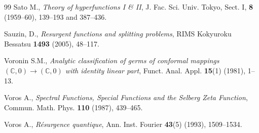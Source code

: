 \documentclass[a4paper,11pt]{amsart}
\numberwithin{equation}{section}
\newcommand{\C}{{\mathbb C}}
\theoremstyle{definition}
\begin{document}
\begin{thebibliography}{99}
	 Sato M., \emph{Theory of hyperfunctions I \& II}, J. Fac. Sci. Univ. Tokyo, Sect. I, \textbf{8} (1959–60), 139–193 and 387–436.
	
	 Sauzin, D., \emph{Resurgent functions and splitting problems}, RIMS Kokyuroku Bessatsu \textbf{1493} (2005), 48--117.
	
	 Voronin S.M., \emph{Analytic classification of germs of conformal mappings $(\C,0)\to(\C,0)$ with identity linear part}, Funct. Anal. Appl. \textbf{15}(1) (1981), 1--13.
	
	 Voros A., \emph{Spectral Functions, Special Functions and the Selberg Zeta Function}, Commun. Math. Phys. \textbf{110} (1987), 439--465.

	 Voros A., \emph{R\'esurgence quantique}, Ann. Inst. Fourier \textbf{43}(5) (1993), 1509--1534.
	
\end{thebibliography}
\end{document}
